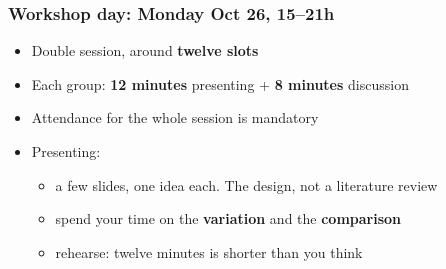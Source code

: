 \begin{frame}
\frametitle{Workshop day: Monday Oct 26, 15--21h}
\centering

\begin{itemize}
  \item Double session, around \textbf{twelve slots}
  \vspace{4pt}
  \item Each group: \textbf{12 minutes} presenting + \textbf{8 minutes} discussion
  \vspace{4pt}
  \item Attendance for the whole session is mandatory
  \vspace{10pt}
  \item<2-> Presenting:
  \begin{itemize}
    \item a few slides, one idea each. The design, not a literature review
    \item spend your time on the \textbf{variation} and the \textbf{comparison}
    \item rehearse: twelve minutes is shorter than you think
  \end{itemize}
\end{itemize}

\end{frame}

